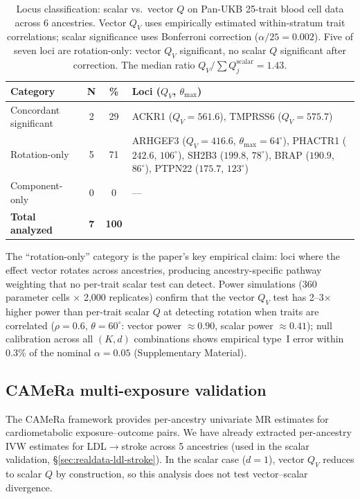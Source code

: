 \documentclass[11pt]{article}
\begin{document}
\begin{table}[t]
\centering
\caption{Locus classification: scalar vs.\ vector $Q$ on Pan-UKB 25-trait blood cell data across 6 ancestries. Vector $Q_V$ uses empirically estimated within-stratum trait correlations; scalar significance uses Bonferroni correction ($\alpha / 25 = 0.002$). Five of seven loci are rotation-only: vector $Q_V$ significant, no scalar $Q$ significant after correction. The median ratio $Q_V / \sum Q_j^{\mathrm{scalar}} = 1.43$.}
\label{tab:jass-comparison}
\small
\begin{tabular}{@{}lccp{5.0cm}@{}}
\toprule
\textbf{Category} & \textbf{N} & \textbf{\%} & \textbf{Loci ($Q_V$, $\theta_{\max}$)} \\
\midrule
Concordant significant & 2 & 29 & ACKR1 ($Q_V\!=\!561.6$), TMPRSS6 ($Q_V\!=\!575.7$) \\
Rotation-only & 5 & 71 & ARHGEF3 ($Q_V\!=\!416.6$, $\theta_{\max}\!=\!64^\circ$), PHACTR1 ($242.6$, $106^\circ$), SH2B3 ($199.8$, $78^\circ$), BRAP ($190.9$, $86^\circ$), PTPN22 ($175.7$, $123^\circ$) \\
Component-only & 0 & 0 & --- \\
\midrule
\textbf{Total analyzed} & \textbf{7} & \textbf{100} & \\
\bottomrule
\end{tabular}
\end{table}

The ``rotation-only'' category is the paper's key empirical claim: loci where the effect vector rotates across ancestries, producing ancestry-specific pathway weighting that no per-trait scalar test can detect. Power simulations (360 parameter cells $\times$ 2{,}000 replicates) confirm that the vector $Q_V$ test has 2--3$\times$ higher power than per-trait scalar $Q$ at detecting rotation when traits are correlated ($\rho = 0.6$, $\theta = 60^\circ$: vector power $\approx 0.90$, scalar power $\approx 0.41$); null calibration across all $(K, d)$ combinations shows empirical type~I error within 0.3\% of the nominal $\alpha = 0.05$ (Supplementary Material).

\subsection{CAMeRa multi-exposure validation}
\label{sec:vector-camera}

The CAMeRa framework \citep{hemani2025camera} provides per-ancestry univariate MR estimates for cardiometabolic exposure--outcome pairs. We have already extracted per-ancestry IVW estimates for LDL$\to$stroke across 5 ancestries (used in the scalar validation, \S\ref{sec:realdata-ldl-stroke}). In the scalar case ($d = 1$), vector $Q_V$ reduces to scalar $Q$ by construction, so this analysis does not test vector--scalar divergence.
\end{document}
